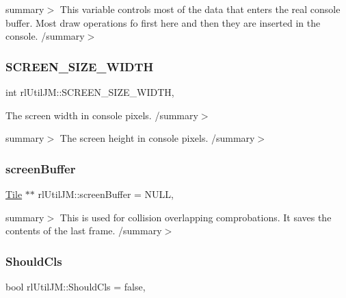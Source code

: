 summary$>$ This variable controls most of the data that enters the real console buffer. Most draw operations fo first here and then they are inserted in the console. /summary$>$ \mbox{\label{classrl_util_j_m_afefcc8459829f1dd722fa8ba2a00de7e}} 
\subsubsection{\texorpdfstring{S\+C\+R\+E\+E\+N\+\_\+\+S\+I\+Z\+E\+\_\+\+W\+I\+D\+TH}{SCREEN\_SIZE\_WIDTH}}
{\footnotesize\ttfamily int rl\+Util\+J\+M\+::\+S\+C\+R\+E\+E\+N\+\_\+\+S\+I\+Z\+E\+\_\+\+W\+I\+D\+TH\hspace{0.3cm}{\ttfamily [static]}, {\ttfamily [private]}}



The screen width in console pixels. /summary$>$ 

summary$>$ The screen height in console pixels. /summary$>$ \mbox{\label{classrl_util_j_m_aeb7bf36dcf28128f978568053552e4f5}} 
\subsubsection{\texorpdfstring{screen\+Buffer}{screenBuffer}}
{\footnotesize\ttfamily \hyperlink{class_tile}{Tile} $\ast$$\ast$ rl\+Util\+J\+M\+::screen\+Buffer = N\+U\+LL\hspace{0.3cm}{\ttfamily [static]}, {\ttfamily [private]}}

summary$>$ This is used for collision overlapping comprobations. It saves the contents of the last frame. /summary$>$ \mbox{\label{classrl_util_j_m_ac5e0a55c087fec67ca6b5ab54d0649c0}} 
\subsubsection{\texorpdfstring{Should\+Cls}{ShouldCls}}
{\footnotesize\ttfamily bool rl\+Util\+J\+M\+::\+Should\+Cls = false\hspace{0.3cm}{\ttfamily [static]}, {\ttfamily [private]}}

